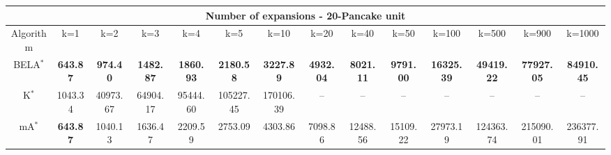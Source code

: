 \begin{tabular}{c|ccccccccccccc}\toprule
\multicolumn{14}{c}{Number of expansions - 20-Pancake unit}\\ \midrule
Algorithm & k=1 & k=2 & k=3 & k=4 & k=5 & k=10 & k=20 & k=40 & k=50 & k=100 & k=500 & k=900 & k=1000 \\ \midrule
BELA$^*$ & \textbf{643.87} & \textbf{974.40} & \textbf{1482.87} & \textbf{1860.93} & \textbf{2180.58} & \textbf{3227.89} & \textbf{4932.04} & \textbf{8021.11} & \textbf{9791.00} & \textbf{16325.39} & \textbf{49419.22} & \textbf{77927.05} & \textbf{84910.45} \\
K$^*$ & 1043.34 & 40973.67 & 64904.17 & 95444.60 & 105227.45 & 170106.39 & -- & -- & -- & -- & -- & -- & -- \\
mA$^*$ & \textbf{643.87} & 1040.13 & 1636.47 & 2209.59 & 2753.09 & 4303.86 & 7098.86 & 12488.56 & 15109.22 & 27973.19 & 124363.74 & 215090.01 & 236377.91 \\ \bottomrule 
\end{tabular}
